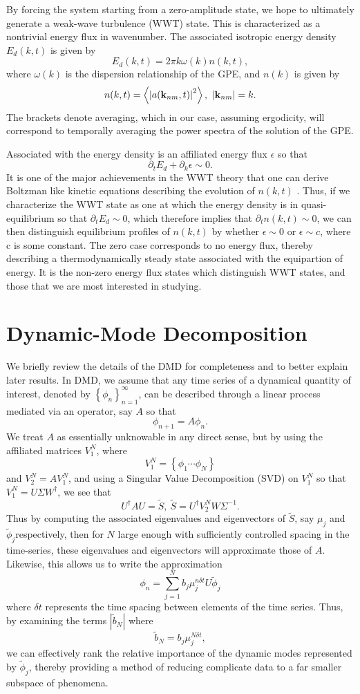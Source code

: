 \documentclass[a4paper,11pt]{article}
\newcommand{\pd}{\partial}
\newcommand{\bk}{{\bf k}}
\begin{document}
By forcing the system starting from a zero-amplitude state, we hope to ultimately generate a weak-wave turbulence (WWT) state.  This is characterized as a nontrivial energy flux in wavenumber.  The associated isotropic energy density $E_{d}(k,t)$ is given by 
\[
E_{d}(k,t) = 2\pi k\omega(k)n(k,t), 
\]
where $\omega(k)$ is the dispersion relationship of the GPE, and $n(k)$ is given by 
\[
n(k,t) = \left< \left|a(\bk_{nm},t)\right|^{2}\right>, ~ \left|\bk_{nm}\right| = k.
\]
The brackets denote averaging, which in our case, assuming ergodicity, will correspond to temporally averaging the power spectra of the solution of the GPE.  

Associated with the energy density is an affiliated energy flux $\epsilon$ so that 
\[
\pd_{t} E_{d} + \pd_{k}\epsilon \sim 0.
\]
It is one of the major achievements in the WWT theory that one can derive Boltzman like kinetic equations describing the evolution of $n(k,t)$ \cite{nazarenko}.  Thus, if we characterize the WWT state as one at which the energy density is in quasi-equilibrium so that $\pd_{t}E_{d}\sim 0$, which therefore implies that $\pd_{t}n(k,t)\sim 0$, we can then distinguish equilibrium profiles of $n(k,t)$ by whether $\epsilon \sim 0$ or $\epsilon \sim c$, where c is some constant.  The zero case corresponds to no energy flux, thereby describing a thermodynamically steady state associated with the equipartion of energy.  It is the non-zero energy flux states which distinguish WWT states, and those that we are most interested in studying.  

\section*{Dynamic-Mode Decomposition}
We briefly review the details of the DMD for completeness and to better explain later results.  In DMD, we assume that any time series of a dynamical quantity of interest, denoted by $\left\{\phi_{n}\right\}_{n=1}^{\infty}$, can be described through a linear process mediated via an operator, say $A$ so that 
\[
\phi_{n+1} = A \phi_{n}.  
\] 
We treat $A$ as essentially unknowable in any direct sense, but by using the affiliated matrices $V_{1}^{N}$, where
\[
V^{N}_{1} = \left\{\phi_{1} \cdots \phi_{N} \right\}
\]
and $V_{2}^{N} = AV_{1}^{N}$, and using a Singular Value Decomposition (SVD) on $V_{1}^{N}$ so that $V_{1}^{N} = U\Sigma W^{\dagger}$, we see that 
\[
U^{\dagger}AU = \tilde{S}, ~ \tilde{S} = U^{\dagger}V_{2}^{N}W\Sigma^{-1}.
\]
Thus by computing the associated eigenvalues and eigenvectors of $\tilde{S}$, say $\mu_{j}$ and $\tilde{\phi}_{j}$respectively, then for $N$ large enough with sufficiently controlled spacing in the time-series, these eigenvalues and eigenvectors will approximate those of $A$.  Likewise, this allows us to write the approximation 
\[
\phi_{n} = \sum_{j=1}^{N} b_{j}\mu_{j}^{n \delta t} U\tilde{\phi}_{j}
\]
where $\delta t$ represents the time spacing between elements of the time series.  Thus, by examining the terms $\left|\tilde{b}_{N}\right|$ where
\[
\tilde{b}_{N} = b_{j} \mu_{j}^{N \delta t},
\]
we can effectively rank the relative importance of the dynamic modes represented by $\tilde{\phi}_{j}$, thereby providing a method of reducing complicate data to a far smaller subspace of phenomena.  
\end{document}
